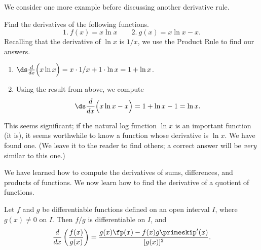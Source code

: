 We consider one more example before discussing another derivative rule.

\begin{example}\label{ex_deriv_ln}
Find the derivatives of the following functions.
\[1.\ f(x) = x\ln x\qquad 2.\ g(x) = x\ln x - x.\]
\solution
Recalling that the derivative of $\ln x$ is $1/x$, we use the Product Rule to find our answers.
\begin{enumerate}
	\item	$\ds \frac{d}{dx}\Big(x\ln x\Big) = x\cdot 1/x + 1\cdot \ln x = 1+\ln x$. 
	\item	Using the result from above, we compute
	\[\ds \frac{d}{dx}\Big(x\ln x-x\Big) = 1+\ln x-1 = \ln x.\]
\end{enumerate}
This seems significant; if the natural log function $\ln x$ is an important function (it is), it seems worthwhile to know a function whose derivative is $\ln x$. We have found one. (We leave it to the reader to find others; a correct answer will be \textit{very} similar to this one.)
\end{example}

We have learned how to compute the derivatives of sums, differences, and products of functions. We now learn how to find the derivative of a quotient of functions.\bigskip

\begin{theorem}\label{thm:QuotientRule}
Let $f$ and $g$ be differentiable functions defined on an open interval $I$, where $g(x) \neq 0$ on $I$. Then $f/g$ is differentiable on $I$, and \[\frac{d}{dx}\left(\frac{f(x)}{g(x)}\right) = \frac{g(x)\fp(x) - f(x)g\primeskip'(x)}{[g(x)]^2}.\]
\end{theorem}


